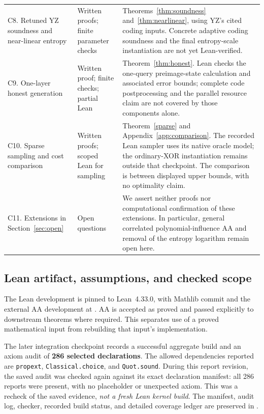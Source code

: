 \documentclass[11pt]{article}
\theoremstyle{definition}\newtheorem{definition}[theorem]{Definition}
\theoremstyle{remark}\newtheorem{remark}[theorem]{Remark}
\begin{document}
\begin{longtable}{@{}>{\raggedright\arraybackslash}p{}>{\raggedright\arraybackslash}p{}>{\raggedright\arraybackslash}p{}@{}}
C8. Retuned YZ soundness and near-linear entropy & Written proofs; finite parameter checks & Theorems~\ref{thm:soundness} and~\ref{thm:nearlinear}, using YZ's cited coding inputs. Concrete adaptive coding soundness and the final entropy-scale instantiation are not yet Lean-verified.\\[5pt]
C9. One-layer honest generation & Written proof; finite checks; partial Lean & Theorem~\ref{thm:honest}. Lean checks the one-query preimage-state calculation and associated error bounds; complete code postprocessing and the parallel resource claim are not covered by those components alone.\\[5pt]
C10. Sparse sampling and cost comparison & Written proofs; scoped Lean for sampling & Theorem~\ref{sparse} and Appendix~\ref{app:comparison}. The recorded Lean sampler uses its native oracle model; the ordinary-XOR instantiation remains outside that checkpoint. The comparison is between displayed upper bounds, with no optimality claim.\\[5pt]
C11. Extensions in Section~\ref{sec:open} & Open questions & We assert neither proofs nor computational confirmation of these extensions. In particular, general correlated polynomial-influence AA and removal of the entropy logarithm remain open here.\\
\end{longtable}
\endgroup

\subsection{Lean artifact, assumptions, and checked scope}\label{sec:lean}
The Lean development is pinned to Lean~4.33.0, with Mathlib commit
 and the external AA development at
. AA is accepted as proved and passed explicitly to downstream theorems where required. This separates use of a proved mathematical input from rebuilding that input's implementation.

The later integration checkpoint records a successful aggregate build and an axiom audit of \textbf{286 selected declarations}. The allowed dependencies reported are \texttt{propext}, \texttt{Classical.choice}, and \texttt{Quot.sound}. During this report revision, the saved audit was checked again against its exact declaration manifest: all 286 reports were present, with no placeholder or unexpected axiom. This was a recheck of the saved evidence, \emph{not a fresh Lean kernel build}. The manifest, audit log, checker, recorded build status, and detailed coverage ledger are preserved in .
\end{document}
